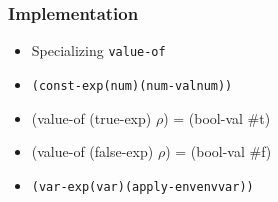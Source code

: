 \documentclass{beamer}
\begin{document}
\begin{frame}[fragile]
\frametitle{Implementation}
\begin{scriptsize}
\begin{itemize}
\item<1-> Specializing \texttt{value-of}

\item<2->
\begin{alltt}
(const-exp (num) (num-val num))
\end{alltt}

\item<3-> (value-of (true-exp) $\rho$) = (bool-val \#t)

\item<3-> (value-of (false-exp) $\rho$) = (bool-val \#f)

\item<4->
\begin{alltt}
(var-exp (var) (apply-env env var))
\end{alltt}

\end{itemize}
\end{scriptsize}
\end{frame}
\end{document}
